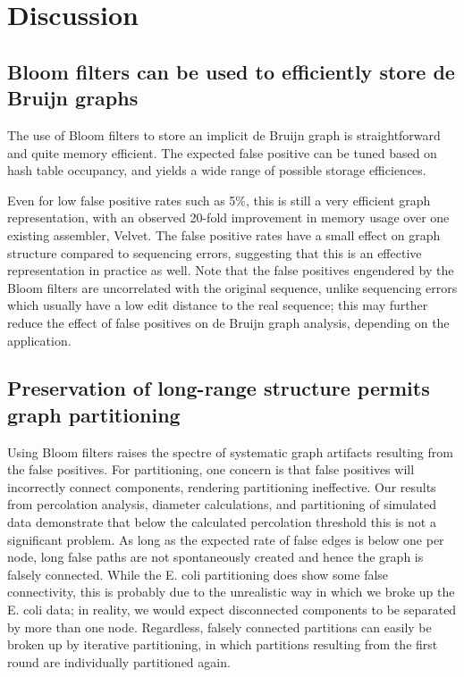 \documentclass[12pt]{article} \usepackage{simplemargins}
\begin{document}
\section{Discussion}

\subsection{Bloom filters can be used to efficiently store de Bruijn graphs}


The use of Bloom filters to store an implicit de Bruijn graph is
straightforward and quite memory efficient.  The expected false
positive can be tuned based on hash table occupancy, and yields a wide
range of possible storage efficiences.


Even for low false positive rates such as 5\%, this is still a very
efficient graph representation, with an observed 20-fold improvement
in memory usage over one existing assembler, Velvet.  The false
positive rates have a small effect on graph structure compared to
sequencing errors, suggesting that this is an effective representation
in practice as well.  Note that the false positives engendered by the
Bloom filters are uncorrelated with the original sequence, unlike
sequencing errors which usually have a low edit distance to the
real sequence; this may further reduce the effect of false positives
on de Bruijn graph analysis, depending on the application.

\subsection{Preservation of long-range structure permits graph partitioning}

Using Bloom filters raises the spectre of systematic graph artifacts
resulting from the false positives.  For partitioning, one concern is
that false positives will incorrectly connect components, rendering
partitioning ineffective.  Our results from percolation analysis,
diameter calculations, and partitioning of simulated data demonstrate
that below the calculated percolation threshold this is not a
significant problem.  As long as the expected rate of false edges is
below one per node, long false paths are not spontaneously created and
hence the graph is falsely connected.  While the E. coli partitioning
does show some false connectivity, this is probably due to the
unrealistic way in which we broke up the E. coli data; in reality, we
would expect disconnected components to be separated by more than one
node.  Regardless, falsely connected partitions can easily be broken
up by iterative partitioning, in which partitions resulting from the
first round are individually partitioned again.
\end{document}
